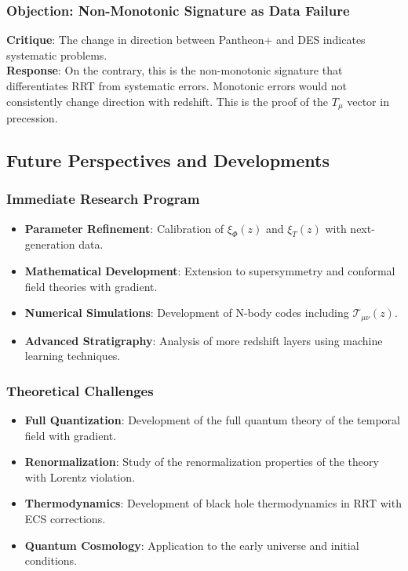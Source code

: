 \documentclass[12pt,a4paper]{article}
\begin{document}
\subsubsection{Objection: Non-Monotonic Signature as Data Failure}
\textbf{Critique}: The change in direction between Pantheon+ and DES indicates systematic problems. \\
\textbf{Response}: On the contrary, this is the non-monotonic signature that differentiates RRT from systematic errors. Monotonic errors would not consistently change direction with redshift. This is the proof of the $T_\mu$ vector in precession.

\subsection{Future Perspectives and Developments}

\subsubsection{Immediate Research Program}
\begin{itemize}
    \item \textbf{Parameter Refinement}: Calibration of $\xi_\Phi(z)$ and $\xi_T(z)$ with next-generation data.
    \item \textbf{Mathematical Development}: Extension to supersymmetry and conformal field theories with gradient.
    \item \textbf{Numerical Simulations}: Development of N-body codes including $\mathcal{T}_{\mu\nu}(z)$.
    \item \textbf{Advanced Stratigraphy}: Analysis of more redshift layers using machine learning techniques.
\end{itemize}

\subsubsection{Theoretical Challenges}
\begin{itemize}
    \item \textbf{Full Quantization}: Development of the full quantum theory of the temporal field with gradient.
    \item \textbf{Renormalization}: Study of the renormalization properties of the theory with Lorentz violation.
    \item \textbf{Thermodynamics}: Development of black hole thermodynamics in RRT with ECS corrections.
    \item \textbf{Quantum Cosmology}: Application to the early universe and initial conditions.
\end{itemize}
\end{document}
